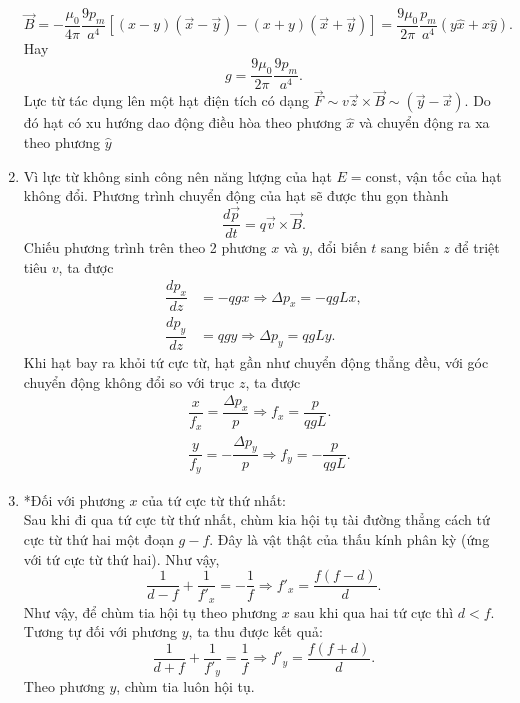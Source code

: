\begin{enumerate}
    \begin{equation} \label{eq7_Strong_Focusing}
        \Vec{B}=- \frac{\mu_0}{4\pi}\frac{9p_m}{a^4}\left[(x-y)(\Vec{x}-\Vec{y})-(x+y)(\Vec{x}+\Vec{y})\right]= \frac{9\mu_0}{2\pi}\frac{p_m}{a^4}(y\hat{x}+x\hat{y}).
    \end{equation}
    Hay
    \begin{equation} \label{eq8_Strong_Focusing}
        g = \dfrac{9 \mu_0}{2 \pi} \dfrac{9 p_m}{a^4}.
    \end{equation}
    Lực từ tác dụng lên một hạt điện tích có dạng $\Vec{F}\sim v\Vec{z}\times \Vec{B} \sim (\Vec{y}-\Vec{x})$. Do đó hạt có xu hướng dao động điều hòa theo phương $\hat{x}$ và chuyển động ra xa theo phương $\hat{y}$
    \item Vì lực từ không sinh công nên năng lượng của hạt $E= \text{const}$, vận tốc của hạt không đổi. Phương trình chuyển động của hạt sẽ được thu gọn thành
    \begin{equation} \label{eq9_Strong_Focusing}
        \frac{d \Vec{p}}{dt}= q \Vec{v} \times \Vec{B}.
    \end{equation}
    Chiếu phương trình trên theo 2 phương $x$ và $y$, đổi biến $t$ sang biến $z$ để triệt tiêu $v$, ta được
    \begin{align} \label{eq10_Strong_Focusing}
        \dfrac{d p_x}{dz} &= -qgx \Rightarrow \Delta p_x = -qgL x, \\
        \label{eq11_Strong_Focusing}
        \dfrac{d p_y}{dz} &= qgy \Rightarrow \Delta p_y = qgL y.
    \end{align}
    Khi hạt bay ra khỏi tứ cực từ, hạt gần như chuyển động thẳng đều, với góc chuyển động không đổi so với trục $z$, ta được
    \begin{align} \label{eq12_Strong_Focusing}
        &\dfrac{x}{f_x} = \dfrac{\Delta p_x}{p} \Rightarrow f_x = \dfrac{p}{qgL}. \\
        \label{eq13_Strong_Focusing}
        &\dfrac{y}{f_y} = -\dfrac{\Delta p_y}{p} \Rightarrow f_y = -\dfrac{p}{qgL}.
    \end{align}
    \item *Đối với phương $x$ của tứ cực từ thứ nhất: \\
    Sau khi đi qua tứ cực từ thứ nhất, chùm kia hội tụ tài đường thẳng cách tứ cực từ thứ hai một đoạn $g-f$. Đây là vật thật của thấu kính phân kỳ (ứng với  tứ cực từ thứ hai). Như vậy,
    \begin{equation} \label{eq14_Strong_Focusing}
        \dfrac{1}{d-f} + \dfrac{1}{f'_x} = -\dfrac{1}{f} \Rightarrow f'_x = \dfrac{f(f-d)}{d}.
    \end{equation}
    Như vậy, để chùm tia hội tụ theo phương $x$ sau khi qua hai tứ cực thì $d<f$.
    Tương tự đối với phương $y$, ta thu được kết quả:
    \begin{equation} \label{eq15_Strong_Focusing}
        \dfrac{1}{d+f} + \dfrac{1}{f'_y} = \dfrac{1}{f} \Rightarrow f'_y = \dfrac{f(f+d)}{d}.
    \end{equation}
    Theo phương $y$, chùm tia luôn hội tụ.
\end{enumerate}

